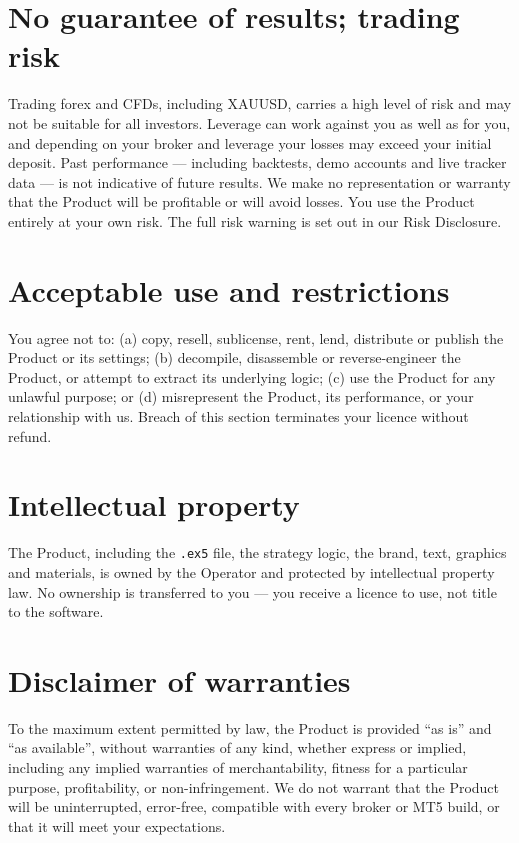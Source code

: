 \documentclass[11pt,a4paper]{article}
\begin{document}
\section{No guarantee of results; trading risk}
Trading forex and CFDs, including XAUUSD, carries a high level of risk and may not be suitable for
all investors. Leverage can work against you as well as for you, and depending on your broker and
leverage your losses may exceed your initial deposit. Past performance --- including backtests, demo
accounts and live tracker data --- is not indicative of future results. We make no representation or
warranty that the Product will be profitable or will avoid losses. You use the Product entirely at
your own risk. The full risk warning is set out in our Risk Disclosure.

\section{Acceptable use and restrictions}
You agree not to: (a) copy, resell, sublicense, rent, lend, distribute or publish the Product or its
settings; (b) decompile, disassemble or reverse-engineer the Product, or attempt to extract its
underlying logic; (c) use the Product for any unlawful purpose; or (d) misrepresent the Product, its
performance, or your relationship with us. Breach of this section terminates your licence without
refund.

\section{Intellectual property}
The Product, including the \texttt{.ex5} file, the strategy logic, the brand, text, graphics and
materials, is owned by the Operator and protected by intellectual property law. No ownership is
transferred to you --- you receive a licence to use, not title to the software.

\section{Disclaimer of warranties}
To the maximum extent permitted by law, the Product is provided ``as is'' and ``as available'',
without warranties of any kind, whether express or implied, including any implied warranties of
merchantability, fitness for a particular purpose, profitability, or non-infringement. We do not
warrant that the Product will be uninterrupted, error-free, compatible with every broker or MT5
build, or that it will meet your expectations.
\end{document}

